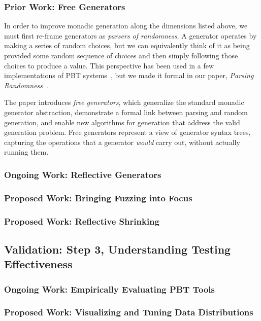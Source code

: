 \subsubsection{Prior Work: Free Generators}
In order to improve monadic generation along the dimensions listed above, we
must first re-frame generators as {\em parsers of randomness}. A generator
operates by making a series of random choices, but we can equivalently think of
it as being provided some random sequence of choices and then simply following
those choices to produce a value. This perspective has been used in a few
implementations of PBT systems~\cn{}, but we made it formal in our paper, {\em
Parsing Randomness}~\cite{goldstein2022parsing}.

The paper introduces {\em free generators}, which generalize the standard
monadic generator abstraction, demonstrate a formal link between parsing and
random generation, and enable new algorithms for generation that address the
valid generation problem. Free generators represent a view of generator syntax
trees, capturing the operations that a generator {\em would} carry out, without
actually running them.

\subsubsection{Ongoing Work: Reflective Generators}

\subsubsection{Proposed Work: Bringing Fuzzing into Focus}

\subsubsection{Proposed Work: Reflective Shrinking}

\subsection{Validation: Step 3, Understanding Testing Effectiveness }
\subsubsection{Ongoing Work: Empirically Evaluating PBT Tools}

\subsubsection{Proposed Work: Visualizing and Tuning Data Distributions}

